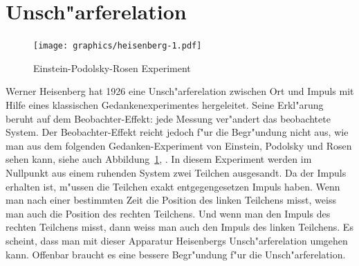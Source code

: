 %
%
\section{Unsch"arferelation}
\begin{figure}
\centering
\texttt{[image: graphics/heisenberg-1.pdf]}
\caption{Einstein-Podolsky-Rosen Experiment
\label{skript:epr-experiment}}
\end{figure}
Werner Heisenberg hat 1926 eine Unsch"arferelation zwischen Ort und Impuls
mit Hilfe eines klassischen Gedankenexperimentes hergeleitet.
Seine Erkl"arung beruht auf dem Beobachter-Effekt: jede Messung
ver"andert das beobachtete System.
Der Beobachter-Effekt reicht jedoch f"ur die Begr"undung nicht
aus, wie man aus dem folgenden Gedanken-Experiment von Einstein,
Podolsky und Rosen sehen kann, siehe
auch Abbildung~\ref{skript:epr-experiment}, \cite{skript:epr}.
In diesem Experiment werden im Nullpunkt aus einem ruhenden System
zwei Teilchen ausgesandt.
Da der Impuls erhalten ist, m"ussen die Teilchen exakt entgegengesetzen
Impuls haben.
Wenn man nach einer bestimmten Zeit die Position des linken Teilchens misst,
weiss man auch die Position des rechten Teilchens.
Und wenn man den Impuls des rechten Teilchens misst, dann weiss
man auch den Impuls des linken Teilchens.
Es scheint, dass man mit dieser Apparatur Heisenbergs Unsch"arferelation
umgehen kann.
Offenbar braucht es eine bessere Begr"undung f"ur die Unsch"arferelation.

